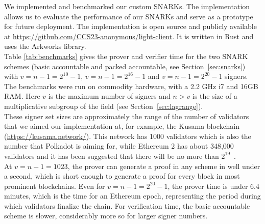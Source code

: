 \noindent We implemented and benchmarked our custom SNARKs. The implementation allows us to evaluate the performance of our SNARKs and serve as a prototype for future deployment. The implementation 
is open source and publicly available at \url{https://github.com/CCS23-anonymous/light-client}. It is written in Rust and uses the Arkworks library. \\

\noindent Table \ref{tab:benchmarks} gives the prover and verifier time for the two SNARK schemes (basic accountable and  packed accountable, see Section~\ref{sec:snarks}) with 
$v = n-1 = 2^{10}-1$, $v = n-1 = 2^{16}-1$ and $v=n-1=2^{20}-1$ signers. The benchmarks were run on commodity hardware, with a 2.2 GHz i7 and 16GB RAM. 
Here $v$ is the maximum number of signers and $n> v$ is the size of a multiplicative subgroup of the field (see Section~\ref{sec:lagrange}).\\

\noindent These signer set sizes are approximately the range of the number of validators that we aimed our implementation at, for example, the Kusama blockchain (\url{https://kusama.network/}). 
This network has 1000 validators which is also the number that Polkadot is aiming for, while Ethereum 2 has about 348,000 validators and it has been suggested that there will be no more 
than $2^{19}$~\cite{ethresearch1}. \\

\noindent At $v = n-1 = 1023$, the prover can generate a proof in any scheme in well under a second, which is short enough to generate a proof for every block in most prominent blockchains. 
Even for $v = n-1 = 2^{20}-1$, the prover time is under 6.4 minutes, which is the time for an Ethereum epoch, representing the period during which validators finalize the chain. 
For verification time, the basic accountable scheme is slower, considerably more so for larger signer numbers. \\
\vspace{-0.12in}


